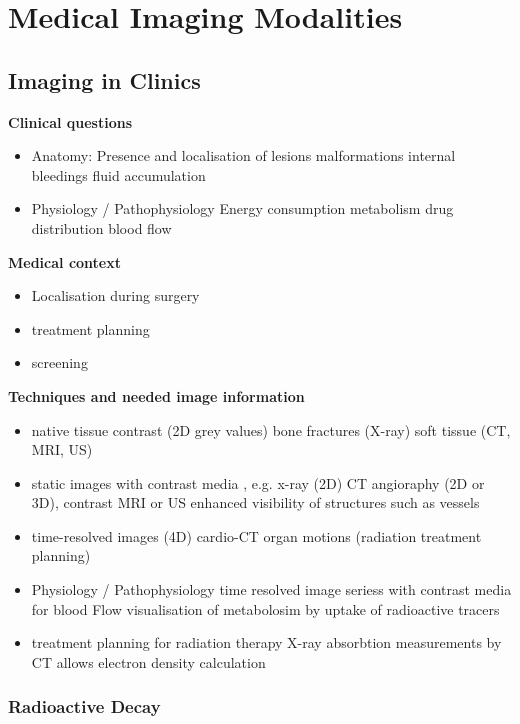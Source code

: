 \documentclass{report}
\theoremstyle{definition}
\theoremstyle{example}
\begin{document}
\chapter{Medical Imaging Modalities}

\section{Imaging in Clinics}
\textbf{Clinical questions}
\begin{itemize}
   \item Anatomy: 
   \subitem Presence and localisation of lesions
   \subitem malformations
   \subitem internal bleedings
   \subitem fluid accumulation
   \item Physiology / Pathophysiology
   \subitem Energy consumption
   \subitem metabolism
   \subitem drug distribution
   \subitem blood flow 
\end{itemize}

\textbf{Medical context}
\begin{itemize}
   \item Localisation during surgery
   \item treatment planning
   \item screening
\end{itemize}

\textbf{Techniques and needed image information}
\begin{itemize}
   \item native tissue contrast (2D grey values)
   \subitem bone fractures (X-ray)
   \subitem soft tissue (CT, MRI, US) 
   \item static images with contrast media , e.g. x-ray (2D) CT angioraphy (2D or 3D), contrast MRI or US
   \subitem enhanced visibility of structures such as vessels
   \item time-resolved images (4D)
   \subitem cardio-CT
   \subitem organ motions (radiation treatment planning)
   \item Physiology / Pathophysiology
   \subitem time resolved image seriess with contrast media for blood Flow
   \subitem visualisation of metabolosim by uptake of radioactive tracers
   \item treatment planning for radiation therapy
   \subitem X-ray absorbtion measurements by CT allows electron density calculation
\end{itemize}

\subsection{Radioactive Decay}
\end{document}
